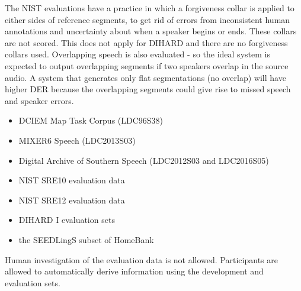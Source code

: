 	The NIST evaluations have a practice in which a forgiveness collar is applied to either sides of reference segments, to get rid of errors from inconsistent human annotations and uncertainty about when a speaker begins or ends. These collars are not scored. This does not apply for DIHARD and there are no forgiveness collars used. Overlapping speech is also evaluated - so the ideal system is expected to output overlapping segments if two speakers overlap in the source audio. A system that generates only flat segmentations (no overlap) will have higher DER because the overlapping segments could give rise to missed speech and speaker errors.

\begin{itemize}
	\item DCIEM Map Task Corpus (LDC96S38)
	\item MIXER6 Speech (LDC2013S03)
	\item Digital Archive of Southern Speech (LDC2012S03 and LDC2016S05)
	\item NIST SRE10 evaluation data
	\item NIST SRE12 evaluation data
	\item DIHARD I evaluation sets
	\item the SEEDLingS subset of HomeBank
\end{itemize}

Human investigation of the evaluation data is not allowed. Participants are allowed to automatically derive information using the development and evaluation sets.
